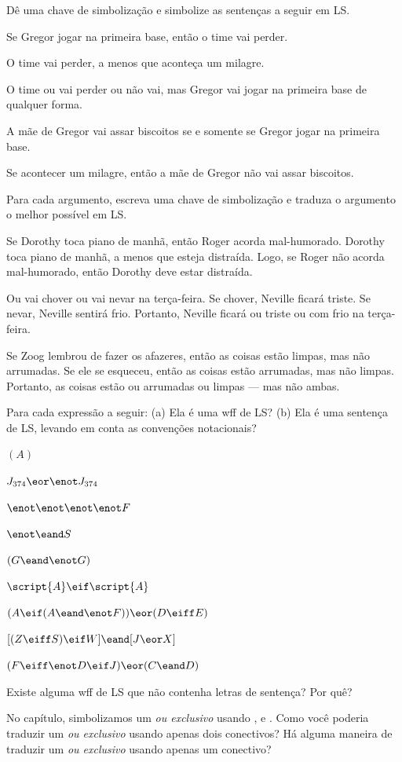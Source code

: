 \problempart Dê uma chave de simbolização e simbolize as sentenças a seguir em LS.
\begin{earg}
\item Se Gregor jogar na primeira base, então o time vai perder.
\item O time vai perder, a menos que aconteça um milagre.
\item O time ou vai perder ou não vai, mas Gregor vai jogar na primeira base de qualquer forma.
\item A mãe de Gregor vai assar biscoitos se e somente se Gregor jogar na primeira base.
\item Se acontecer um milagre, então a mãe de Gregor não vai assar biscoitos.
\end{earg}


\problempart
Para cada argumento, escreva uma chave de simbolização e traduza o argumento o melhor possível em LS.
\begin{earg}
\item Se Dorothy toca piano de manhã, então Roger acorda mal-humorado. Dorothy toca piano de manhã, a menos que esteja distraída. Logo, se Roger não acorda mal-humorado, então Dorothy deve estar distraída.
\item Ou vai chover ou vai nevar na terça-feira. Se chover, Neville ficará triste. Se nevar, Neville sentirá frio. Portanto, Neville ficará ou triste ou com frio na terça-feira.
\item Se Zoog lembrou de fazer os afazeres, então as coisas estão limpas, mas não arrumadas. Se ele se esqueceu, então as coisas estão arrumadas, mas não limpas. Portanto, as coisas estão ou arrumadas ou limpas — mas não ambas.
\end{earg}



\solutions
\problempart
\label{pr.wiffLS}
Para cada expressão a seguir: (a) Ela é uma wff de LS? (b) Ela é uma sentença de LS, levando em conta as convenções notacionais?
\begin{earg}
\item $(A)$
\item $J_{374} \eor \enot J_{374}$
\item $\enot \enot \enot \enot F$
\item $\enot \eand S$
\item $(G \eand \enot G)$
\item $\script{A} \eif \script{A}$
\item $(A \eif (A \eand \enot F)) \eor (D \eiff E)$
\item $[(Z \eiff S) \eif W] \eand [J \eor X]$
\item $(F \eiff \enot D \eif J) \eor (C \eand D)$
\end{earg}



\problempart
\begin{earg}
\item Existe alguma wff de LS que não contenha letras de sentença? Por quê?
\item No capítulo, simbolizamos um \emph{ou exclusivo} usando \eor, \eand e \enot. Como você poderia traduzir um \emph{ou exclusivo} usando apenas dois conectivos? Há alguma maneira de traduzir um \emph{ou exclusivo} usando apenas um conectivo?
\end{earg}
